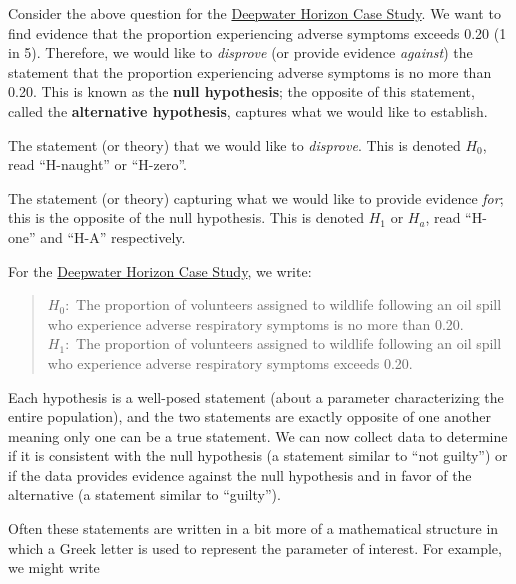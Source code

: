 \documentclass[]{book}
\theoremstyle{definition}
\theoremstyle{definition}
\theoremstyle{remark}
\let\BeginKnitrBlock\begin \let\EndKnitrBlock\end
\begin{document}
Consider the above question for the
\protect\hyperlink{CaseDeepwater}{Deepwater Horizon Case Study}. We want
to find evidence that the proportion experiencing adverse symptoms
exceeds 0.20 (1 in 5). Therefore, we would like to \emph{disprove} (or
provide evidence \emph{against}) the statement that the proportion
experiencing adverse symptoms is no more than 0.20. This is known as the
\textbf{null hypothesis}; the opposite of this statement, called the
\textbf{alternative hypothesis}, captures what we would like to
establish.

\BeginKnitrBlock{definition}[Null Hypothesis]
\protect\hypertarget{def:defn-null-hypothesis}{}{\label{def:defn-null-hypothesis}
{} }The statement (or theory) that we
would like to \emph{disprove}. This is denoted \(H_0\), read
``H-naught'' or ``H-zero''.
\EndKnitrBlock{definition}

\BeginKnitrBlock{definition}[Alternative Hypothesis]
\protect\hypertarget{def:defn-alternative-hypothesis}{}{\label{def:defn-alternative-hypothesis}
{} }The statement (or theory)
capturing what we would like to provide evidence \emph{for}; this is the
opposite of the null hypothesis. This is denoted \(H_1\) or \(H_a\),
read ``H-one'' and ``H-A'' respectively.
\EndKnitrBlock{definition}

For the \protect\hyperlink{CaseDeepwater}{Deepwater Horizon Case Study},
we write:

\begin{quote}
\(H_0:\) The proportion of volunteers assigned to wildlife following an
oil spill who experience adverse respiratory symptoms is no more than
0.20.\\
\(H_1:\) The proportion of volunteers assigned to wildlife following an
oil spill who experience adverse respiratory symptoms exceeds 0.20.
\end{quote}

Each hypothesis is a well-posed statement (about a parameter
characterizing the entire population), and the two statements are
exactly opposite of one another meaning only one can be a true
statement. We can now collect data to determine if it is consistent with
the null hypothesis (a statement similar to ``not guilty'') or if the
data provides evidence against the null hypothesis and in favor of the
alternative (a statement similar to ``guilty'').

Often these statements are written in a bit more of a mathematical
structure in which a Greek letter is used to represent the parameter of
interest. For example, we might write
\end{document}
